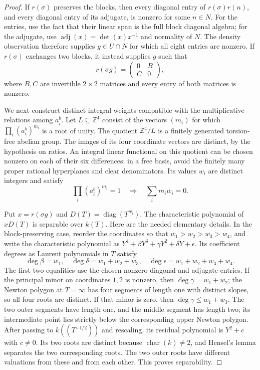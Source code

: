 \documentclass[11pt,a4paper]{article}
\theoremstyle{remark}
\newcommand{\Z}{\mathbb Z}
\begin{document}
\begin{proof}
If $r(\sigma)$ preserves the blocks, then every diagonal entry of
$r(\sigma)r(n)$, and every diagonal entry of its adjugate, is
nonzero for some $n\in N$. For the entries, use the fact that their
linear span is the full block diagonal algebra; for the adjugate,
use $\operatorname{adj}(x)=\det(x)x^{-1}$ and normality of $N$.
The density observation therefore supplies $g\in U\cap N$ for
which all eight entries are nonzero. If $r(\sigma)$ exchanges two
blocks, it instead supplies $g$ such that
\[
 r(\sigma g)=\begin{pmatrix}0&B\\ C&0\end{pmatrix},
\]
where $B,C$ are invertible $2\times2$ matrices and every entry of
both matrices is nonzero.

We next construct distinct integral weights compatible with the
multiplicative relations among $a_i^b$. Let $L\subseteq\Z^4$ consist
of the vectors $(m_i)$ for which $\prod_i(a_i^b)^{m_i}$ is a root
of unity. The quotient $\Z^4/L$ is a finitely generated torsion-free
abelian group. The images of its four coordinate vectors are
distinct, by the hypothesis on ratios. An integral linear
functional on this quotient can be chosen nonzero on each of their
six differences: in a free basis, avoid the finitely many proper
rational hyperplanes and clear denominators. Its values $w_i$
are distinct integers and satisfy
\[
 \prod_i(a_i^b)^{m_i}=1\quad\Longrightarrow\quad
 \sum_i m_iw_i=0.                                      \tag{*}
\]

Put $x=r(\sigma g)$ and $D(T)=\operatorname{diag}(T^{w_i})$.
The characteristic polynomial of $xD(T)$ is separable over $k(T)$.
Here are the needed elementary details. In the block-preserving
case, reorder the coordinates so that $w_1>w_2>w_3>w_4$, and write
the characteristic polynomial as
$Y^4+\beta Y^3+\gamma Y^2+\delta Y+\epsilon$.
Its coefficient degrees as Laurent polynomials in $T$ satisfy
\[
 \deg\beta=w_1,\quad \deg\delta=w_1+w_2+w_3,
 \quad\deg\epsilon=w_1+w_2+w_3+w_4.
\]
The first two equalities use the chosen nonzero diagonal and
adjugate entries. If the principal minor on coordinates $1,2$
is nonzero, then $\deg\gamma=w_1+w_2$; the Newton polygon at
$T=\infty$ has four segments of length one with distinct slopes,
so all four roots are distinct. If that minor is zero, then
$\deg\gamma\leq w_1+w_3$. The two outer segments have length one,
and the middle segment has length two; its intermediate point lies
strictly below the corresponding upper Newton polygon.
After passing to $k((T^{-1/2}))$ and rescaling, its residual polynomial
is $Y^2+c$ with $c\ne0$. Its two roots are distinct because
$\operatorname{char}(k)\ne2$, and Hensel's lemma separates the two
corresponding roots. The two outer roots have different valuations
from these and from each other. This proves separability.


\end{proof}
\end{document}
